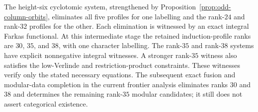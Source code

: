 The height-six cyclotomic system, strengthened by
Proposition~\ref{prop:odd-column-orbits}, eliminates all five profiles for
one labelling and the rank-$24$ and rank-$32$ profiles for the other.
Each elimination is witnessed by an exact integral Farkas functional.
At this intermediate stage the retained induction-profile ranks are
$30$, $35$, and $38$, with
one character labelling.  The rank-$35$ and rank-$38$ systems have explicit
nonnegative integral witnesses.  A stronger rank-$35$ witness also satisfies
the low-Verlinde and restriction-product constraints.  These witnesses
verify only the stated necessary equations. The subsequent exact
fusion and modular-data completion in the current frontier analysis
eliminates ranks $30$ and $38$ and determines the remaining rank-$35$
modular candidates; it still does not assert categorical existence.
